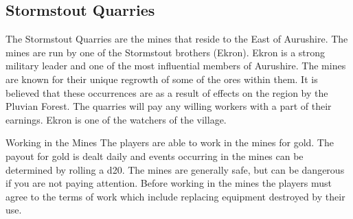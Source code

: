 \subsection{Stormstout Quarries}

The Stormstout Quarries are the mines that reside to the East of Aurushire. The mines are run by one of the Stormstout brothers (Ekron). Ekron is a strong military leader and one of the most influential members of Aurushire. The mines are known for their unique regrowth of some of the ores within them. It is believed that these occurrences are as a result of effects on the region by the Pluvian Forest. The quarries will pay any willing workers with a part of their earnings. Ekron is one of the watchers of the village.

\begin{commentbox}{Working in the Mines}
	The players are able to work in the mines for gold. The payout for gold is dealt daily and events occurring in the mines can be determined by rolling a d20. The mines are generally safe, but can be dangerous if you are not paying attention. Before working in the mines the players must agree to the terms of work which include replacing equipment destroyed by their use.
	

\end{commentbox}
